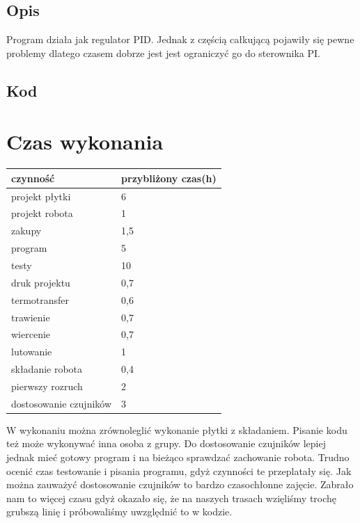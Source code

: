 \documentclass[a4paper,11pt]{article}
\begin{document}
\subsection{Opis}
Program działa jak regulator PID. Jednak z częścią całkującą pojawiły się pewne problemy dlatego czasem dobrze jest jest ograniczyć go do sterownika PI.

\subsection{Kod}

\section{Czas wykonania}
\begin{center}


	\begin{tabular}{|l|l|}
		\hline
		czynność				& przybliżony czas(h)		\\ \hline
		projekt płytki			& 6							\\
		projekt robota			& 1							\\
		zakupy					& 1,5						\\
		program					& 5							\\
		testy					& 10							\\
		druk projektu			& 0,7						\\
		termotransfer			& 0,6						\\
		trawienie				& 0,7						\\
		wiercenie				& 0,7						\\
		lutowanie				& 1							\\
		składanie robota			& 0,4						\\
		pierwszy rozruch			& 2							\\
		dostosowanie czujników	& 3							\\

		\hline
	\end{tabular}
\end{center}
W wykonaniu można zrównoleglić  wykonanie płytki z składaniem. Pisanie kodu też może wykonywać inna osoba z grupy. Do dostosowanie czujników lepiej jednak mieć gotowy program i na bieżąco sprawdzać zachowanie robota.
Trudno ocenić czas testowanie i pisania programu, gdyż czynności te przeplatały się.
Jak można zauważyć dostosowanie czujników to bardzo czasochłonne zajęcie. Zabrało nam to więcej czasu gdyż okazało się, że na naszych trasach wzięliśmy trochę grubszą linię i próbowaliśmy uwzględnić to w kodzie.
\end{document}
